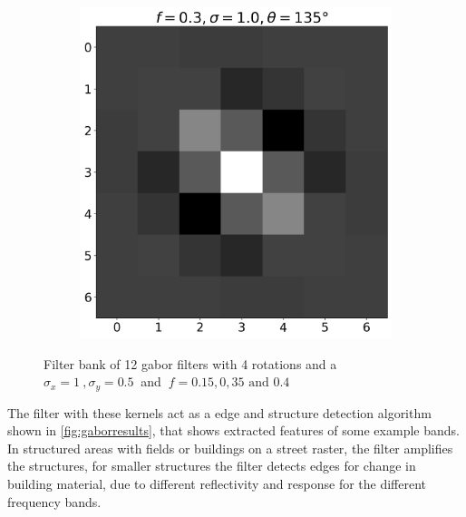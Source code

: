 \documentclass[12pt,a4paper, english,twoside]{article}
\begin{document}
\begin{figure}[!htbp]
\begin{subfigure}[b]{0.3\textwidth}
      \end{subfigure}
      \begin{subfigure}[b]{0.3\textwidth}
        \includegraphics[width=\textwidth]{img/K11.png}
      \end{subfigure}
      \caption{Filter bank of 12 gabor filters with 4 rotations and a $\sigma_x=1\ ,\sigma_y = 0.5\ $ and $\ f = 0.15, 0,35 \text{ and } 0.4$\label{fig:gaborbank}}%
    \end{figure}
%  
    \noindent
    The filter with these kernels act as a edge and structure detection algorithm shown in \cref{fig:gaborresults}, that shows extracted features of some example bands.
    In structured areas with fields or buildings on a street raster, the filter amplifies the structures, for smaller structures the filter detects edges for change in building material, due to different reflectivity and response for the different frequency bands. 
  
\end{document}
